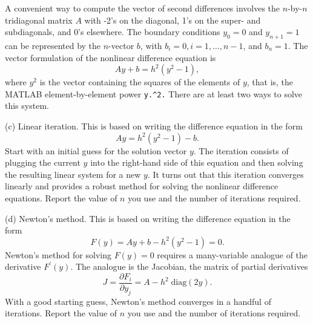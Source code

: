 \begin{description}
A convenient way to compute the vector of second differences involves the $n$-by-$n$ tridiagonal matrix $A$ with -2's on the diagonal, 1's on the super- and subdiagonals, and 0's elsewhere.  %
The boundary conditions $y_0 = 0$ and $y_{n + 1} = 1$ can be represented by the $n$-vector $b$, with $b_i = 0, i = 1, \ldots, n - 1$, and $b_n = 1$.  The vector formulation of the nonlinear difference equation is
\[
Ay + b = h^2 (y^2 - 1),
\]
where $y^2$ is the vector containing the squares of the elements of $y$, that is, the MATLAB element-by-element power \verb+y.^2.+  There are at least two ways to solve this system.  
\item{(c)}  Linear iteration.  This is based on writing the difference equation in the form
\[
Ay = h^2 (y^2 - 1) - b.
\]
Start with an initial guess for the solution vector $y$.  The iteration consists of plugging the current $y$ into the right-hand side of this equation and then solving the resulting linear system for a new $y$. %
%
It turns out that this iteration converges linearly and provides a robust method for solving the nonlinear difference equations.  Report the value of $n$ you use and the number of iterations required.
\item{(d)}  Newton's method.  This is based on writing the difference equation in the form 
\[
F(y) = Ay + b - h^2 (y^2 - 1) = 0.
\]
Newton's method for solving $F(y) = 0$ requires a many-variable analogue of the derivative $F^\prime (y)$.  The analogue is the Jacobian, the matrix of partial derivatives
\[
J = \frac{\partial F_i}{\partial y_j} = A - h^2 \; \mbox{diag} (2y).
\]
% 
With a good starting guess, Newton's method converges in a handful of iterations.  Report the value of $n$ you use and the number of iterations required.


\end{description}
